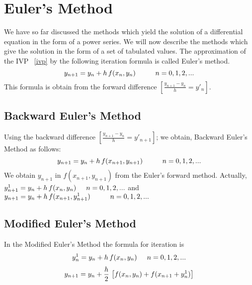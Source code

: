 \documentclass[aima203_lecturenotes_ku.tex]{subfiles}
\begin{document}
\section{Euler's Method}
We have so far discussed the methods which yield the solution of a differential equation in the form of a power series. We will now describe the methods which give the solution in the form of a set of tabulated values. The approximation of the IVP ~\ref{ivp} by the following iteration formula is called Euler's method.
\begin{equation}
  \label{eq:9}
  y_{n+1} = y_n + h\,f(x_n,y_n) \hspace{10mm} n=0,1,2,...
\end{equation}
This formula is obtain from the forward difference $\left [ \displaystyle \frac{y_{n+1} -y_n}{h} = y'_{n} \right ]$.

\subsection{Backward Euler's Method}
Using the backward difference $\left [ \displaystyle \frac{y_{n+1} -y_n}{h} = y'_{n+1} \right ]$; we obtain, Backward Euler's Method as follows:
\begin{equation}
  \label{eq:9}
  y_{n+1} = y_n + h\,f(x_{n+1}, y_{n+1}) \hspace{10mm} n=0,1,2,...
\end{equation}
We obtain $y_{n+1}$ in $f(x_{n+1}, y_{n+1})$ from the Euler's forward method. Actually, \\
$y^{1}_{n+1} = y_n + h\,f(x_n,y_n) \hspace{5mm} n=0,1,2,...$ and $y_{n+1} = y_n + h\,f(x_{n+1}, y^{1}_{n+1}) \hspace{10mm} n=0,1,2,...$

\subsection{Modified Euler's Method}
In the Modified Euler's Method the formula for iteration is
\begin{equation}
  \label{eq:9}
  \begin{gathered}[b]
    y^{1}_{n} = y_n + h\,f(x_n,y_n) \hspace{5mm} n=0,1,2,... \\[1mm]
     y_{n+1} = y_n + \frac{h}{2} \,\left [ f(x_n,y_n) + f(x_{n+1} + y^{1}_{n}) \right ]
  \end{gathered}
\end{equation}
\end{document}
